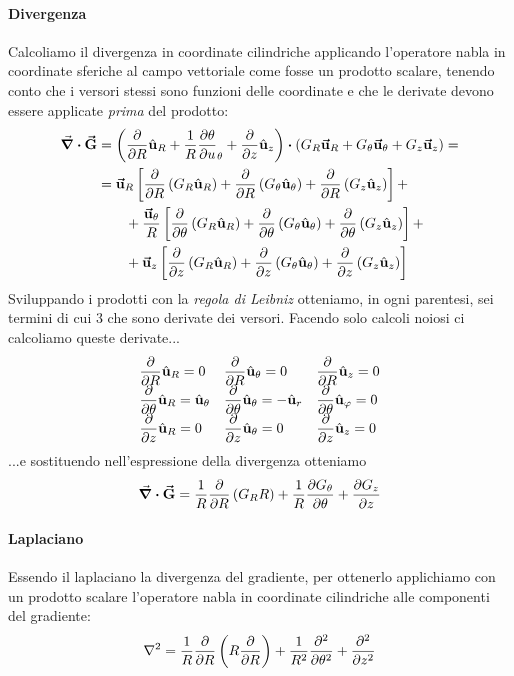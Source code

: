 \paragraph{Divergenza}
Calcoliamo il divergenza in coordinate cilindriche applicando l'operatore nabla in coordinate sferiche al campo vettoriale come fosse un prodotto scalare, tenendo conto che i versori stessi sono funzioni delle coordinate e che le derivate devono essere applicate \textit{prima} del prodotto:
\begin{align*}
	\div{\vba{G}}&=\left(\pdv{R}\vbh{u}_R+\frac{1}{R}\pdv{\theta}{u}_\theta+\pdv{z}\vbh{u}_z\right)\vdot\left(G_R\vba{u}_R+G_\theta\vba{u}_\theta+G_z\vba{u}_z\right)=\\
	&=\vba{u}_R\left[\pdv{R}\left(G_R\vbh{u}_R\right)+\pdv{R}\left(G_\theta\vbh{u}_\theta\right)+\pdv{R}\left(G_z\vbh{u}_{z}\right)\right]+\\
	&\qquad+\frac{\vba{u}_\theta}{R}\left[\pdv{\theta}\left(G_R\vbh{u}_R\right)+\pdv{\theta}\left(G_\theta\vbh{u}_\theta\right)+\pdv{\theta}\left(G_z\vbh{u}_{z}\right)\right]+\\
	&\qquad+\vba{u}_z\left[\pdv{z}\left(G_R\vbh{u}_R\right)+\pdv{z}\left(G_\theta\vbh{u}_\theta\right)+\pdv{z}\left(G_z\vbh{u}_{z}\right)\right]
\end{align*}
Sviluppando i prodotti con la \textit{regola di Leibniz} otteniamo, in ogni parentesi, sei termini di cui 3 che sono derivate dei versori. Facendo solo calcoli noiosi ci calcoliamo queste derivate...
\begin{equation*}
	\begin{array}{*3{>{\displaystyle}l}}
	\pdv{R}\vbh{u}_R=0&
	\pdv{R}\vbh{u}_\theta=0&
	\pdv{R}\vbh{u}_z=0\\
	\pdv{\theta}\vbh{u}_R=\vbh{u}_\theta&
	\pdv{\theta}\vbh{u}_\theta=-\vbh{u}_r&
	\pdv{\theta}\vbh{u}_\phi=0\\
	\pdv{z}\vbh{u}_R=0&
	\pdv{z}\vbh{u}_\theta=0&
	\pdv{z}\vbh{u}_z=0
	\end{array}
\end{equation*}
...e sostituendo nell'espressione della divergenza otteniamo
\begin{equation}
	\div{\vb*{\va{G}}}=\frac{1}{R}\pdv{R}\left(G_R R\right)+\frac{1}{R}\pdv{G_\theta}{\theta}+\pdv{G_z}{z}
\end{equation}
\paragraph{Laplaciano}
Essendo il laplaciano la divergenza del gradiente, per ottenerlo applichiamo con un prodotto scalare l'operatore nabla in coordinate cilindriche alle componenti del gradiente:
\begin{equation}
	\laplacian=\frac{1}{R}\pdv{R}\left(R\pdv{R}\right)+\frac{1}{R^2}\pdv[2]{\theta}+\pdv[2]{z}
\end{equation}
